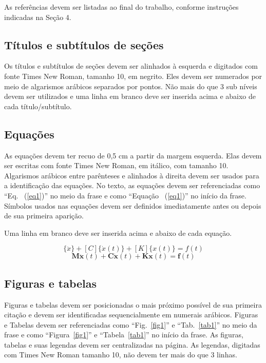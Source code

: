 \documentclass[10pt,fleqn,a4paper,twoside]{article}
\begin{document}
As referências devem ser listadas ao final do trabalho, conforme instruções indicadas na Seção 4.

\subsection{Títulos e subtítulos de seções}

Os títulos e subtítulos de seções devem ser alinhados à esquerda e digitados com fonte Times New Roman, tamanho 10, em negrito. Eles devem ser numerados por meio de algarismos arábicos separados por pontos. Não mais do que 3 sub níveis devem ser utilizados e uma linha em branco deve ser inserida acima e abaixo de cada título/subtítulo.

\subsection{Equações}

As equações devem ter recuo de 0,5 cm a partir da margem esquerda. Elas devem ser escritas com fonte Times New Roman, em itálico, com tamanho 10. Algarismos arábicos entre parênteses e alinhados à direita devem ser usados para a identificação das equações. No texto, as equações devem ser referenciadas como “Eq. ~(\ref{eq1})” no meio da frase e como “Equação ~(\ref{eq1})” no início da frase.  Símbolos usados nas equações devem ser definidos imediatamente antes ou depois de sua primeira aparição.

Uma linha em branco deve ser inserida acima e abaixo de cada equação.

\begin{equation}
[M]\{\ddot{x}\}+[C]\{\dot{x}(t)\}+[K]\{x(t)\}={f(t)} 
\label{eq1}
\end{equation}
\begin{equation}
\mathbf{M\ddot{x}}(t)+\mathbf{C\dot{x}}(t)+\mathbf{Kx}(t)=\mathbf{f}(t) 
\label{eq2}
\end{equation}

\subsection{Figuras e tabelas}

Figuras e tabelas devem ser posicionadas o mais próximo possível de sua primeira citação e devem ser identificadas sequencialmente em numerais arábicos. Figuras e Tabelas devem ser referenciadas como ``Fig.~\ref{fig1}'' e ``Tab.~\ref{tab1}'' no meio da frase e como ``Figura~\ref{fig1}''  e ``Tabela~\ref{tab1}'' no início da frase. As figuras, tabelas e suas legendas devem ser centralizadas na página. As legendas, digitadas com Times New Roman tamanho 10, não devem ter mais do que 3 linhas.
\end{document}
